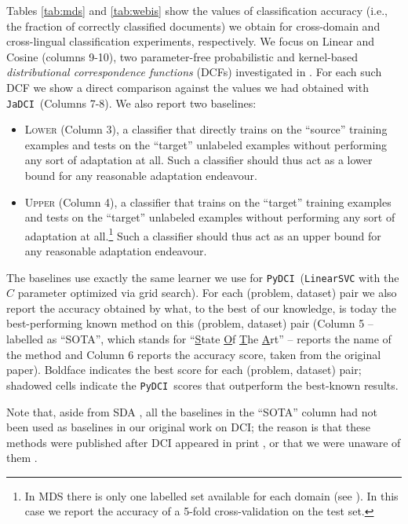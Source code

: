\documentclass{article}
\newcommand{\jadci}{\texttt{JaDCI}}
\newcommand{\pydci}{\texttt{PyDCI}}
\begin{document}
Tables \ref{tab:mds} and \ref{tab:webis} show the values of
classification accuracy (i.e., the fraction of correctly classified
documents) we obtain for cross-domain and cross-lingual classification
experiments, respectively.  We focus on Linear and Cosine (columns
9-10), two parameter-free probabilistic and kernel-based
\emph{distributional correspondence functions} (DCFs) investigated in
\citep{Moreo:2016fg}. For each such DCF we show a direct comparison
against the values we had obtained with \jadci\ (Columns 7-8).  We
also report two baselines:

\begin{itemize}

\item \textsc{Lower} (Column 3), a classifier that directly trains on
  the ``source'' training examples and tests on the ``target''
  unlabeled examples without performing any sort of adaptation at
  all. Such a classifier should thus act as a lower bound for any
  reasonable adaptation endeavour.

\item \textsc{Upper} (Column 4), a classifier that trains on the
  ``target'' training examples and tests on the ``target'' unlabeled
  examples without performing any sort of adaptation at
  all.\footnote{In MDS there is only one labelled set available for
  each domain (see \citep{Blitzer:2007gf}). In this case we report the
  accuracy of a 5-fold cross-validation on the test set.} Such a
  classifier should thus act as an upper bound for any reasonable
  adaptation endeavour.

\end{itemize}

\noindent The baselines use exactly the same learner we use for
\pydci\ (\texttt{LinearSVC} with the $C$ parameter optimized via grid
search). For each (problem, dataset) pair we also report the accuracy
obtained by what, to the best of our knowledge, is today the
best-performing known method on this (problem, dataset) pair (Column 5
-- labelled as ``SOTA'', which stands for ``\underline{S}tate
\underline{O}f \underline{T}he \underline{A}rt'' -- reports the name
of the method and Column 6 reports the accuracy score, taken from the
original paper).  Boldface indicates the best score for each (problem,
dataset) pair; shadowed cells indicate the \pydci\ scores that
outperform the best-known results.

Note that, aside from SDA \citep{glorot2011domain}, all the baselines
in the ``SOTA'' column had not been used as baselines in our original
work on DCI; the reason is that these methods were published after DCI
appeared in print
\citep{ganin2016domain,Li:2017kg,xu2017cross,zhou2016cross}, or that
we were unaware of them \citep{Yang:2015nb}.
\end{document}
